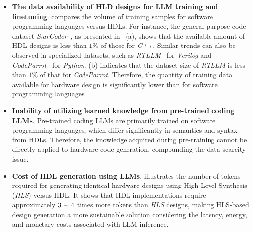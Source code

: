 \begin{itemize}[leftmargin=*]
    \item \textbf{The data availability of HLD designs for LLM training and finetuning}.  compares the volume of training samples for software programming languages versus HDLs.
    For instance, the general-purpose code dataset \textit{StarCoder}~\cite{li2023starcoder}, as presented in~ (a), shows that the available amount of HDL designs is less than $1\%$ of those for \textit{C++}.
    Similar trends can also be observed in specialized datasets, such as \textit{RTLLM}~\cite{lu2024rtllm} for \textit{Verilog} and \textit{CodeParrot}~\cite{tunstall2022natural} for \textit{Python}. (b) indicates that the dataset size of \textit{RTLLM} is less than $1\%$ of that for \textit{CodeParrot}. Therefore, the quantity of training data available for hardware design is significantly lower than for software programming languages. 
    \item \textbf{Inability of utilizing learned knowledge from pre-trained coding LLMs}. Pre-trained coding LLMs are primarily trained on software programming languages, which differ significantly in semantics and syntax from HDLs. Therefore, the knowledge acquired during pre-training cannot be directly applied to hardware code generation, compounding the data scarcity issue. 

    \item \textbf{Cost of HDL generation using LLMs}.  illustrates the number of tokens required for generating identical hardware designs using High-Level Synthesis (\textit{HLS}) versus HDL. It shows that HDL implementations require approximately $3 \thicksim 4$ times more tokens than \textit{HLS} designs, making HLS-based design generation a more sustainable solution considering the latency, energy, and monetary costs associated with LLM inference. 
    
\end{itemize}

